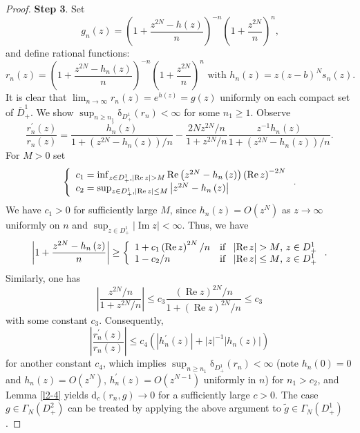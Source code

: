 \documentclass[10pt,a4paper]{amsart}
\begin{document}
\begin{proof}
\textbf{Step 3}. Set
\[
g_{n}\left(  z\right)  =\left(  1+\dfrac{z^{2N}-h\left(  z\right)  }%
{n}\right)  ^{-n}\left(  1+\dfrac{z^{2N}}{n}\right)  ^{n}\text{,}%
\]
and define rational functions:%
\[
r_{n}\left(  z\right)  =\left(  1+\dfrac{z^{2N}-h_{n}\left(  z\right)  }%
{n}\right)  ^{-n}\left(  1+\dfrac{z^{2N}}{n}\right)  ^{n}\text{ with }%
h_{n}\left(  z\right)  =z\left(  z-b\right)  ^{N}s_{n}\left(  z\right)
\text{.}%
\]
It is clear that $\lim_{n\rightarrow\infty}r_{n}\left(  z\right)  =e^{h\left(
z\right)  }=g(z)$ uniformly on each compact set of $\overline{D}_{+}^{1}$. We
show $\sup_{n\geq n_{1}}\mathrm{\delta}_{D_{+}^{1}}\left(  r_{n}\right)
<\infty$ for some $n_{1}\geq1$. Observe%
\[
\dfrac{r_{n}^{\prime}\left(  z\right)  }{r_{n}\left(  z\right)  }=\dfrac
{h_{n}^{\prime}(z)}{1+\left(  z^{2N}-h_{n}\left(  z\right)  \right)
/n}-\dfrac{2Nz^{2N}/n}{1+z^{2N}/n}\dfrac{z^{-1}h_{n}\left(  z\right)
}{1+\left(  z^{2N}-h_{n}\left(  z\right)  \right)  /n}\text{.}%
\]
For $M>0$ set%
\[
\left\{
\begin{array}
[c]{l}%
c_{1}=\inf_{z\in D_{+}^{1},\left\vert \operatorname{Re}z\right\vert
>M}\operatorname{Re}\left(  z^{2N}-h_{n}\left(  z\right)  \right)  \left(
\operatorname{Re}z\right)  ^{-2N}\\
c_{2}=\sup_{z\in D_{+}^{1},\left\vert \operatorname{Re}z\right\vert \leq
M}\left\vert z^{2N}-h_{n}\left(  z\right)  \right\vert
\end{array}
\right.  \text{.}%
\]
We have $c_{1}>0$ for sufficiently large $M$, since $h_{n}\left(  z\right)
=O\left(  z^{N}\right)  $ as $z\rightarrow\infty$ uniformly on $n$ and
$\sup_{z\in D_{+}^{1}}\left\vert \operatorname{Im}z\right\vert <\infty$. Thus,
we have%
\[
\left\vert 1+\dfrac{z^{2N}-h_{n}\left(  z\right)  }{n}\right\vert \geq\left\{
%
\begin{array}
[c]{ll}%
1+c_{1}\left(  \operatorname{Re}z\right)  ^{2N}/n & \text{if \ }\left\vert
\operatorname{Re}z\right\vert >M\text{, }z\in D_{+}^{1}\\
1-c_{2}/n & \text{if \ }\left\vert \operatorname{Re}z\right\vert \leq M\text{,
}z\in D_{+}^{1}%
\end{array}
\right.  \text{.}%
\]
Similarly, one has%
\[
\left\vert \dfrac{z^{2N}/n}{1+z^{2N}/n}\right\vert \leq c_{3}\dfrac{\left(
\operatorname{Re}z\right)  ^{2N}/n}{1+\left(  \operatorname{Re}z\right)
^{2N}/n}\leq c_{3}%
\]
with some constant $c_{3}$. Consequently,%
\[
\left\vert \dfrac{r_{n}^{\prime}\left(  z\right)  }{r_{n}\left(  z\right)
}\right\vert \leq c_{4}\left(  \left\vert h_{n}^{\prime}(z)\right\vert
+\left\vert z\right\vert ^{-1}\left\vert h_{n}\left(  z\right)  \right\vert
\right)
\]
for another constant $c_{4}$, which implies $\sup_{n\geq n_{1}}\mathrm{\delta
}_{D_{+}^{1}}\left(  r_{n}\right)  <\infty$ (note $h_{n}(0)=0$ and
$h_{n}\left(  z\right)  =O\left(  z^{N}\right)  $, $h_{n}^{\prime}\left(
z\right)  =O\left(  z^{N-1}\right)  $ uniformly in $n$) for $n_{1}>c_{2}$, and
Lemma \ref{l2-4} yields $\mathrm{d}_{c}\left(  r_{n},g\right)  \rightarrow0$
for a sufficiently large $c>0$. The case $g\in\Gamma_{N}\left(  D_{+}%
^{2}\right)  $ can be treated by applying the above argument to $\widetilde
{g}\in\Gamma_{N}\left(  D_{+}^{1}\right)  $.\bigskip
\end{proof}
\end{document}
